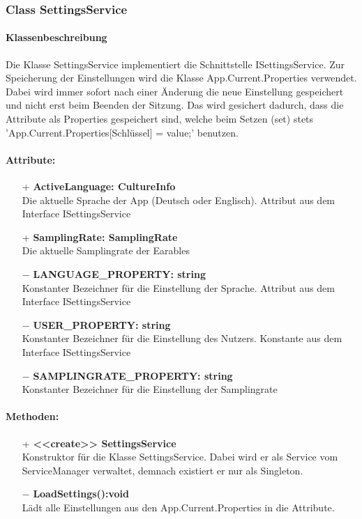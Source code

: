 \documentclass[a4paper,12pt]{article}
\begin{document}
\subsubsection{Class SettingsService}
	\paragraph{Klassenbeschreibung}
	Die Klasse SettingsService implementiert die Schnittstelle ISettingsService. Zur Speicherung der Einstellungen wird die Klasse App.Current.Properties verwendet.
	Dabei wird immer sofort nach einer Änderung die neue Einstellung gespeichert und nicht erst beim Beenden der Sitzung.
	Das wird gesichert dadurch, dass die Attribute als Properties gespeichert sind, welche beim Setzen (set) stets 'App.Current.Properties[Schlüssel] = value;' benutzen.
	\paragraph{Attribute:}
	\begin{itemize}
		\item[+] \textbf{ActiveLanguage: CultureInfo}\\Die aktuelle Sprache der App (Deutsch oder Englisch). Attribut aus dem Interface ISettingsService\\
		\item[+] \textbf{SamplingRate: SamplingRate}\\Die aktuelle Samplingrate der \Gls{Earables} \\ 
		\item[$-$] \textbf{LANGUAGE\_PROPERTY: string}\\Konstanter Bezeichner für die Einstellung der Sprache. Attribut aus dem Interface ISettingsService \\
		\item[$-$] \textbf{USER\_PROPERTY: string}\\Konstanter Bezeichner für die Einstellung des Nutzers. Konstante aus dem Interface ISettingsService \\
		\item[$-$] \textbf{SAMPLINGRATE\_PROPERTY: string}\\Konstanter Bezeichner für die Einstellung der Samplingrate \\
	\end{itemize}
	\paragraph{Methoden:}
	\begin{itemize}
		\item[+] \textbf{<<create>> SettingsService}\\Konstruktor für die Klasse SettingsService. Dabei wird er als Service vom ServiceManager verwaltet, demnach existiert er nur als Singleton.
		\item[$-$] \textbf{LoadSettings():void}\\Lädt alle Einstellungen aus den App.Current.Properties in die Attribute.	
	\end{itemize}
\end{document}

